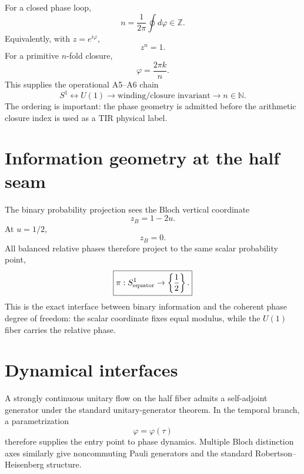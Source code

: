 For a closed phase loop,
\begin{equation}
\boxed{
n=\frac1{2\pi}\oint d\varphi\in\mathbb Z.
}
\label{eq:v12_winding}
\end{equation}
Equivalently, with $z=e^{i\varphi}$,
\begin{equation}
z^n=1.
\end{equation}
For a primitive $n$-fold closure,
\begin{equation}
\varphi=\frac{2\pi k}{n}.
\end{equation}
This supplies the operational A5--A6 chain
\begin{equation}
\boxed{
S^1
\longleftrightarrow
U(1)
\longrightarrow
\text{winding/closure invariant}
\longrightarrow
n\in\mathbb N.
}
\end{equation}
The ordering is important: the phase geometry is admitted before the arithmetic closure index is used as a TIR physical label.

\section{Information geometry at the half seam}

The binary probability projection sees the Bloch vertical coordinate
\begin{equation}
z_B=1-2u.
\end{equation}
At $u=1/2$,
\begin{equation}
z_B=0.
\end{equation}
All balanced relative phases therefore project to the same scalar probability point,
\begin{equation}
\boxed{
\pi:S^1_{\rm equator}\to\left\{\frac12\right\}.
}
\end{equation}
This is the exact interface between binary information and the coherent phase degree of freedom: the scalar coordinate fixes equal modulus, while the $U(1)$ fiber carries the relative phase.

\section{Dynamical interfaces}

A strongly continuous unitary flow on the half fiber admits a self-adjoint generator under the standard unitary-generator theorem. In the temporal branch, a parametrization
\begin{equation}
\varphi=\varphi(\tau)
\end{equation}
therefore supplies the entry point to phase dynamics. Multiple Bloch distinction axes similarly give noncommuting Pauli generators and the standard Robertson--Heisenberg structure.

